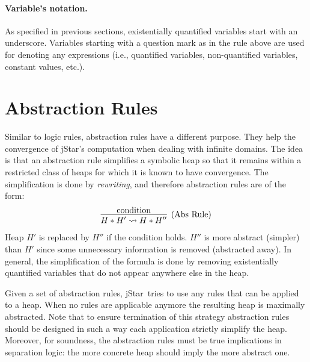 \documentclass[11pt]{article}
\newcommand{\jStar}{{\sf jStar}}
\begin{document}
\paragraph{Variable's notation.} As specified in previous sections, existentially quantified variables
start with an underscore. Variables starting with a question mark as in the rule above are used for 
denoting any expressions (i.e., quantified variables, non-quantified variables, constant values, etc.). 


\section{Abstraction Rules}
\label{sec:abstraction-rules}
Similar to logic rules, abstraction rules have a different purpose. They help the convergence of \jStar's computation when dealing with infinite domains. The idea is that an abstraction rule simplifies 
a symbolic heap so that it remains within a restricted class of heaps for which it is known to have 
convergence. The simplification is done by {\em rewriting}, and therefore  
 abstraction rules are of the form:
\[
\infer[\mbox{(Abs Rule)}]{H * H' \leadsto H *H''}{ \mbox{condition}}
\]
Heap $H'$ is replaced by $H''$ if the condition holds.  $H''$ is
more abstract (simpler) than $H'$ since some unnecessary information is removed
(abstracted away).  In general, the simplification of the formula is
done by removing existentially quantified variables that do not appear
anywhere else in the heap. 

Given a set of abstraction rules, \jStar \  tries to use
any rules that can be applied to a heap. When no rules are applicable
anymore the resulting heap is maximally abstracted. 
Note that to ensure termination of this strategy abstraction rules should be designed in 
such a way each application strictly simplify the heap.
Moreover, for soundness, the abstraction rules must
be true implications in separation logic: the more concrete heap
should imply the more abstract one.
\end{document}
